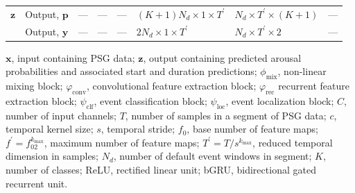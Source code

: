 \begin{landscape}
\begin{table}[tb]
\begin{threeparttable}
\begin{tabular}{@{}llllllll@{}}
            \(\mathbf{z}\) & Output, \(\mathbf{p}\) & --- & --- & --- & $\left( K + 1 \right) \! N_d \times 1 \times T^{\prime}$ & $N_d \times T^{\prime} \times \left( K + 1 \right)$ & --- \\
             & Output, \(\mathbf{y}\) & --- & --- & --- & $2 N_d \times 1 \times T^{\prime}$ & $N_d \times T^{\prime} \times 2$ & --- \\
            \bottomrule
        \end{tabular}
        \begin{tablenotes}
            \small
            \item \(\mathbf{x}\), input containing PSG data; $\mathbf{z}$, output containing predicted arousal probabilities and associated start and duration predictions; \( \phi_{\mathrm{mix}} \), non-linear mixing block; \(\varphi_{\mathrm{conv}}\), convolutional feature extraction block; \( \varphi_{\mathrm{rec}} \) recurrent feature extraction block; \( \psi_{\mathrm{clf}} \), event classification block; \( \psi_{\mathrm{loc}} \), event localization block; $C$, number of input channels; $T$, number of samples in a segment of PSG data; $c$, temporal kernel size; $s$, temporal stride; $f_0$, base number of feature maps; $f^{\prime}=f_02^{k_{\mathrm{max}}}$, maximum number of feature maps; $T^{\prime} = T/s^{k_{\mathrm{max}}}$, reduced temporal dimension in samples; $N_d$, number of default event windows in segment; $K$, number of classes; ReLU, rectified linear unit; bGRU, bidirectional gated recurrent unit.
        \end{tablenotes}
    \end{threeparttable}
\end{table}
\end{landscape}

